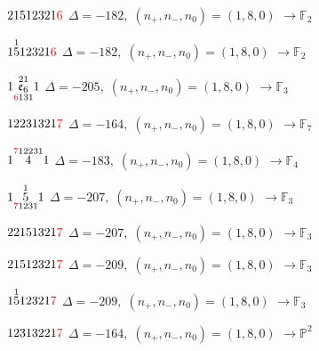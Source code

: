 \documentclass[10pt]{article}
\begin{document}
\smallskip

$21512321\textcolor{red}{6}$ \quad $\Delta=-182,\; (n_+,n_-,n_0)=(1,8,0)$ \quad $\to \mathbb{F}_{2}$

\smallskip

$1\overset{1}{5}12321\textcolor{red}{6}$ \quad $\Delta=-182,\; (n_+,n_-,n_0)=(1,8,0)$ \quad $\to \mathbb{F}_{2}$

\smallskip

$1\overset{21}{\underset{\textcolor{red}{6}131}{\mathfrak{e}_6}}1$ \quad $\Delta=-205,\; (n_+,n_-,n_0)=(1,8,0)$ \quad $\to \mathbb{F}_{3}$

\smallskip

$12231321\textcolor{red}{7}$ \quad $\Delta=-164,\; (n_+,n_-,n_0)=(1,8,0)$ \quad $\to \mathbb{F}_{7}$

\smallskip

$1\overset{\textcolor{red}{7}12231}{4}1$ \quad $\Delta=-183,\; (n_+,n_-,n_0)=(1,8,0)$ \quad $\to \mathbb{F}_{4}$

\smallskip

$1\overset{1}{\underset{\textcolor{red}{7}1231}{5}}1$ \quad $\Delta=-207,\; (n_+,n_-,n_0)=(1,8,0)$ \quad $\to \mathbb{F}_{3}$

\smallskip

$22151321\textcolor{red}{7}$ \quad $\Delta=-207,\; (n_+,n_-,n_0)=(1,8,0)$ \quad $\to \mathbb{F}_{3}$

\smallskip

$21512321\textcolor{red}{7}$ \quad $\Delta=-209,\; (n_+,n_-,n_0)=(1,8,0)$ \quad $\to \mathbb{F}_{3}$

\smallskip

$1\overset{1}{5}12321\textcolor{red}{7}$ \quad $\Delta=-209,\; (n_+,n_-,n_0)=(1,8,0)$ \quad $\to \mathbb{F}_{3}$

\smallskip

$12313221\textcolor{red}{7}$ \quad $\Delta=-164,\; (n_+,n_-,n_0)=(1,8,0)$ \quad $\to \mathbb{P}^2$

\smallskip
\end{document}
